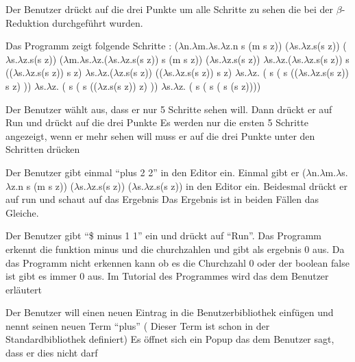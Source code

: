\documentclass[parskip=full,11pt,twoside]{scrartcl}
\begin{document}
{ Der Benutzer drückt auf die drei Punkte um alle Schritte zu sehen die bei der $\beta$-Reduktion durchgeführt wurden. }

{ Das Programm zeigt folgende Schritte :
	\newline ($\lambda$n.$\lambda$m.$\lambda$s.$\lambda$z.n s (m s z)) ($\lambda$s.$\lambda$z.s(s z)) ($\lambda$s.$\lambda$z.s(s z))
	\newline ($\lambda$m.$\lambda$s.$\lambda$z.($\lambda$s.$\lambda$z.s(s z)) s (m s z)) ($\lambda$s.$\lambda$z.s(s z))
	\newline $\lambda$s.$\lambda$z.($\lambda$s.$\lambda$z.s(s z)) s (($\lambda$s.$\lambda$z.s(s z)) s z)
	\newline $\lambda$s.$\lambda$z.($\lambda$z.s(s z)) (($\lambda$s.$\lambda$z.s(s z)) s z)
	\newline $\lambda$s.$\lambda$z. ( s ( s (($\lambda$s.$\lambda$z.s(s z)) s z) ))
	\newline $\lambda$s.$\lambda$z. ( s ( s (($\lambda$z.s(s z)) z) ))
	\newline $\lambda$s.$\lambda$z. ( s ( s ( s (s z))))}

{Der Benutzer wählt aus, dass er nur 5 Schritte sehen will. Dann drückt er auf Run und drückt auf die drei Punkte}
{Es werden nur die ersten 5 Schritte angezeigt, wenn er mehr sehen will muss er auf die drei Punkte unter den Schritten drücken}

{Der Benutzer gibt einmal \enquote{plus 2 2} in den Editor ein. Einmal gibt er ($\lambda$n.$\lambda$m.$\lambda$s.$\lambda$z.n s (m s z)) ($\lambda$s.$\lambda$z.s(s z)) ($\lambda$s.$\lambda$z.s(s z)) in den Editor ein. Beidesmal drückt er auf run und schaut auf das Ergebnis}
{Das Ergebnis ist in beiden Fällen das Gleiche. }

{Der Benutzer gibt \enquote{\$ minus 1 1} ein und drückt auf \enquote{Run}.}
{Das Programm erkennt die funktion minus und die churchzahlen und gibt als ergebnis 0 aus. Da das Programm nicht erkennen kann ob es die Churchzahl 0 oder der boolean false ist gibt es immer 0 aus. Im Tutorial des Programmes wird das dem Benutzer erläutert }

{Der Benutzer will einen neuen Eintrag in die Benutzerbibliothek einfügen und nennt seinen neuen Term \enquote{plus} ( Dieser Term ist schon in der Standardbibliothek definiert) }
{Es öffnet sich ein Popup das dem Benutzer sagt, dass er dies nicht darf}
\end{document}
